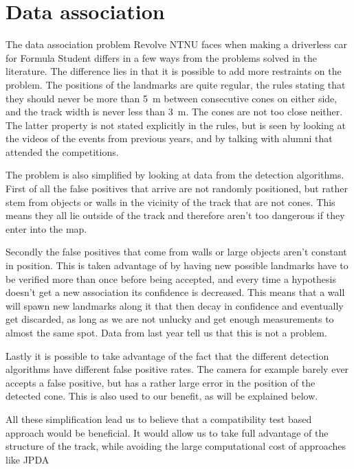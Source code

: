 \section{Data association}

The data association problem Revolve NTNU faces when making a driverless car for Formula Student differs in a few ways from the problems solved in the literature. The difference lies in that it is possible to add more restraints on the problem. The positions of the landmarks are quite regular, the rules stating that they should never be more than \SI{5}{\meter} between consecutive cones on either side, and the track width is never less than \SI{3}{\meter}. The cones are not too close neither. The latter property is not stated explicitly in the rules, but is seen by looking at the videos of the events from previous years, and by talking with alumni that attended the competitions. 

The problem is also simplified by looking at data from the detection algorithms. First of all the false positives that arrive are not randomly positioned, but rather stem from objects or walls in the vicinity of the track that are not cones. This means they all lie outside of the track and therefore aren't too dangerous if they enter into the map. 

Secondly the false positives that come from walls or large objects aren't constant in position. This is taken advantage of by having new possible landmarks have to be verified more than once before being accepted, and every time a hypothesis doesn't get a new association its confidence is decreased. This means that a wall will spawn new landmarks along it that then decay in confidence and eventually get discarded, as long as we are not unlucky and get enough measurements to almost the same spot. Data from last year tell us that this is not a problem. 

Lastly it is possible to take advantage of the fact that the different detection algorithms have different false positive rates. The camera for example barely ever accepts a false positive, but has a rather large error in the position of the detected cone. This is also used to our benefit, as will be explained below. 

All these simplification lead us to believe that a compatibility test based approach would be beneficial. It would allow us to take full advantage of the structure of the track, while avoiding the large computational cost of approaches like \gls{JPDA}

